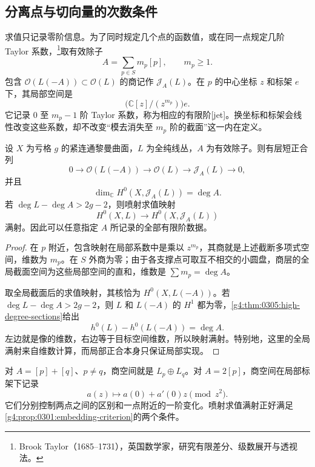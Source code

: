 \subsection{分离点与切向量的次数条件}
\label{g4:subsec:0305:02}

求值只记录零阶信息。为了同时规定几个点的函数值，或在同一点规定几阶 Taylor 系数，\footnote{Brook Taylor（1685--1731），英国数学家，研究有限差分、级数展开与透视法。}取有效除子
\[
	A=\sum_{p\in S}m_p[p],\qquad m_p\ge1.
\]
包含 \(\mathcal O(L(-A))\subset\mathcal O(L)\) 的商记作 \(\mathcal J_A(L)\)。在 \(p\) 的中心坐标 \(z\) 和标架 \(e\) 下，其局部空间是
\[
	\bigl(\mathbb C[z]/(z^{m_p})\bigr)e.
\]
它记录 \(0\) 至 \(m_p-1\) 阶 Taylor 系数，称为相应的有限阶[jet]。换坐标和标架会线性改变这些系数，却不改变“模去消失至 \(m_p\) 阶的截面”这一内在定义。

\begin{proposition}\label{g4:prop:0305:jet-evaluation}
	设 \(X\) 为亏格 \(g\) 的紧连通黎曼曲面，\(L\) 为全纯线丛，\(A\) 为有效除子。则有层短正合列
	\[
		0\longrightarrow\mathcal O(L(-A))
		\longrightarrow\mathcal O(L)
		\longrightarrow\mathcal J_A(L)\longrightarrow0,
	\]
	并且
	\[
		\dim_{\mathbb C}H^0(X,\mathcal J_A(L))=\deg A.
	\]
	若 \(\deg L-\deg A>2g-2\)，则喷射求值映射
	\[
		H^0(X,L)\longrightarrow H^0(X,\mathcal J_A(L))
	\]
	满射。因此可以任意指定 \(A\) 所记录的全部有限阶数据。
\end{proposition}
\begin{proof}
	在 \(p\) 附近，包含映射在局部系数中是乘以 \(z^{m_p}\)，其商就是上述截断多项式空间，维数为 \(m_p\)。在 \(S\) 外商为零；由于各支撑点可取互不相交的小圆盘，商层的全局截面空间为这些局部空间的直和，维数是 \(\sum m_p=\deg A\)。

	取全局截面后的求值映射，其核恰为 \(H^0(X,L(-A))\)。若 \(\deg L-\deg A>2g-2\)，则 \(L\) 和 \(L(-A)\) 的 \(H^1\) 都为零，\cref{g4:thm:0305:high-degree-sections}给出
	\[
		h^0(L)-h^0(L(-A))=\deg A.
	\]
	左边就是像的维数，右边等于目标空间维数，所以映射满射。特别地，这里的全局满射来自维数计算，而局部正合本身只保证局部实现。
\end{proof}

对 \(A=[p]+[q]\)、\(p\ne q\)，商空间就是 \(L_p\oplus L_q\)。对 \(A=2[p]\)，商空间在局部标架下记录
\[
	a(z)\longmapsto a(0)+a'(0)z\pmod{z^2}.
\]
它们分别控制两点之间的区别和一点附近的一阶变化。喷射求值满射正好满足\cref{g4:prop:0301:embedding-criterion}的两个条件。

